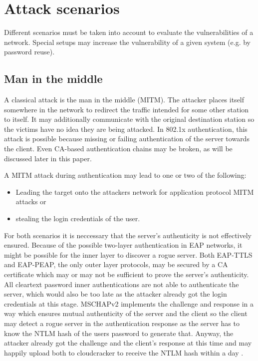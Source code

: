 \documentclass[12pt,a4paper]{scrartcl}
\begin{document}
\section{Attack scenarios}
Different scenarios must be taken into account to evaluate the vulnerabilities of a network.
Special setups may increase the vulnerability of a given system (e.g. by password reuse).

\subsection{Man in the middle}
A classical attack is the man in the middle (MITM).
The attacker places itself somewhere in the network to redirect the traffic intended for some other station to itself.
It may additionally communicate with the original destination station so the victims have no idea they are being attacked.
In 802.1x authentication, this attack is possible because missing or failing authentication of the server towards the client.
Even CA-based authentication chains may be broken, as will be discussed later in this paper.

A MITM attack during authentication may lead to one or two of the following:
\begin{itemize}
  \item Leading the target onto the attackers network for application protocol MITM attacks or
  \item stealing the login credentials of the user.
\end{itemize}

For both scenarios it is neccessary that the server's authenticity is not effectively ensured.
Because of the possible two-layer authentication in EAP networks, it might be possible for the inner layer to discover a rogue server.
Both EAP-TTLS and EAP-PEAP, the only outer layer protocols, may be secured by a CA certificate which may or may not be sufficient to prove the server's authenticity.
All cleartext password inner authentications are not able to authenticate the server, which would also be too late as the attacker already got the login credentials at this stage.
MSCHAPv2 implements the challenge and response in a way which ensures mutual authenticity of the server and the client so the client may detect a rogue server in the authentication response as the server has to know the NTLM hash of the users password to generate that.
Anyway, the attacker already got the challenge and the client's response at this time and may happily upload both to cloudcracker to receive the NTLM hash within a day \cite{cloudcracker}.
\end{document}

